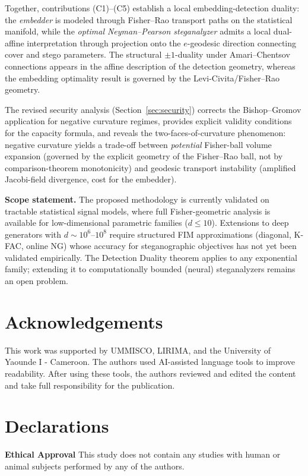 \documentclass[a4paper,fleqn]{cas-dc}
\begin{document}
Together, contributions (C1)--(C5) establish a local embedding-detection
duality:
the \emph{embedder} is modeled through Fisher--Rao transport paths on the
statistical manifold, while the \emph{optimal Neyman--Pearson steganalyzer}
admits a local dual-affine interpretation through projection onto the
$e$-geodesic direction connecting cover and stego parameters. The
structural $\pm1$-duality under Amari--Chentsov connections appears in the
affine description of the detection geometry, whereas the embedding
optimality result is governed by the Levi-Civita/Fisher--Rao geometry.

The revised security analysis (Section~\ref{sec:security}) corrects the
Bishop--Gromov application for negative curvature regimes, provides
explicit validity conditions for the capacity formula, and reveals the
two-faces-of-curvature phenomenon: negative curvature yields a trade-off
between \emph{potential} Fisher-ball volume expansion (governed by the explicit
geometry of the Fisher--Rao ball, not by comparison-theorem monotonicity)
and geodesic transport instability (amplified Jacobi-field divergence,
cost for the embedder).

\textbf{Scope statement.}
The proposed methodology is currently validated on tractable statistical
signal models, where full Fisher-geometric analysis is available for
low-dimensional parametric families ($d \leq 10$). Extensions to deep
generators with $d \sim 10^6$--$10^8$ require structured FIM
approximations (diagonal, K-FAC, online NG) whose accuracy for
steganographic objectives has not yet been validated empirically.
The Detection Duality theorem applies to any exponential family;
extending it to computationally bounded (neural) steganalyzers remains
an open problem.

\section*{Acknowledgements}
This work was supported by UMMISCO, LIRIMA, and the University of
Yaounde I - Cameroon.  The authors used AI-assisted language tools to
improve readability.  After using these tools, the authors reviewed and edited the content and take full responsibility for the publication.

\printcredits

\section*{Declarations}
\begin{sloppypar}
\textbf{Ethical Approval} This study does not contain any studies with
human or animal subjects performed by any of the authors.
\end{sloppypar}
\end{document}
